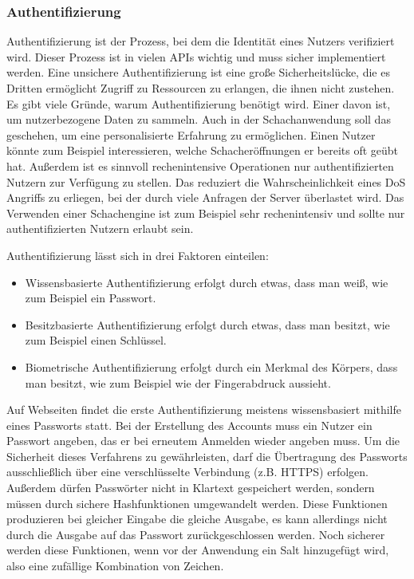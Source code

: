 \subsubsection{Authentifizierung}
\label{cp:auth}
Authentifizierung ist der Prozess, bei dem die Identität eines Nutzers verifiziert wird.
Dieser Prozess ist in vielen APIs wichtig und muss sicher implementiert werden. Eine unsichere Authentifizierung ist eine große Sicherheitslücke, die es Dritten ermöglicht Zugriff zu Ressourcen zu erlangen, die ihnen nicht zustehen.
Es gibt viele Gründe, warum Authentifizierung benötigt wird. Einer davon ist, um nutzerbezogene Daten zu sammeln.
Auch in der Schachanwendung soll das geschehen, um eine personalisierte Erfahrung zu ermöglichen.
Einen Nutzer könnte zum Beispiel interessieren, welche Schacheröffnungen er bereits oft geübt hat. Außerdem ist es sinnvoll rechenintensive Operationen nur authentifizierten Nutzern zur Verfügung zu stellen. Das reduziert die Wahrscheinlichkeit eines \ac{DoS} Angriffs zu erliegen, bei der durch viele Anfragen der Server überlastet wird. Das Verwenden einer Schachengine ist zum Beispiel sehr rechenintensiv und sollte nur authentifizierten Nutzern erlaubt sein.

Authentifizierung lässt sich in drei Faktoren einteilen:
\begin{itemize}
    \item Wissensbasierte Authentifizierung erfolgt durch etwas, dass man weiß, wie zum Beispiel ein Passwort.
    \item Besitzbasierte Authentifizierung erfolgt durch etwas, dass man besitzt, wie zum Beispiel einen Schlüssel.
    \item Biometrische Authentifizierung erfolgt durch ein Merkmal des Körpers, dass man besitzt, wie zum Beispiel wie der Fingerabdruck aussieht.
\end{itemize}

Auf Webseiten findet die erste Authentifizierung meistens wissensbasiert mithilfe eines Passworts statt. Bei der Erstellung des Accounts muss ein Nutzer ein Passwort angeben, das er bei erneutem Anmelden wieder angeben muss.
Um die Sicherheit dieses Verfahrens zu gewährleisten, darf die Übertragung des Passworts ausschließlich über eine verschlüsselte Verbindung (z.B. HTTPS) erfolgen. Außerdem dürfen Passwörter nicht in Klartext gespeichert werden, sondern müssen durch sichere Hashfunktionen umgewandelt werden. Diese Funktionen produzieren bei gleicher Eingabe die gleiche Ausgabe, es kann allerdings nicht durch die Ausgabe auf das Passwort zurückgeschlossen werden. Noch sicherer werden diese Funktionen, wenn vor der Anwendung ein Salt hinzugefügt wird, also eine zufällige Kombination von Zeichen.

